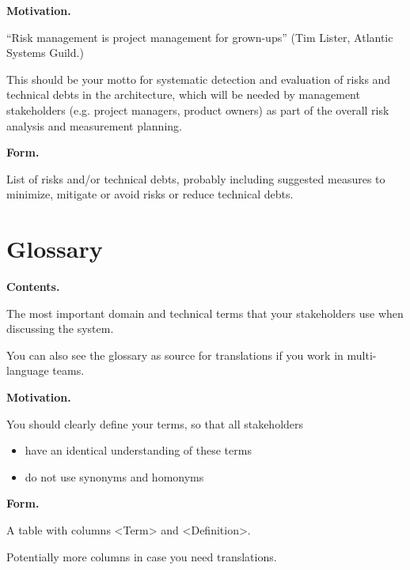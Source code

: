\documentclass[]{article}
\begin{document}
\textbf{Motivation.}

``Risk management is project management for grown-ups'' (Tim Lister,
Atlantic Systems Guild.)

This should be your motto for systematic detection and evaluation of
risks and technical debts in the architecture, which will be needed by
management stakeholders (e.g. project managers, product owners) as part
of the overall risk analysis and measurement planning.

\textbf{Form.}

List of risks and/or technical debts, probably including suggested
measures to minimize, mitigate or avoid risks or reduce technical debts.

\hypertarget{section-glossary}{%
\section{Glossary}\label{section-glossary}}

\textbf{Contents.}

The most important domain and technical terms that your stakeholders use
when discussing the system.

You can also see the glossary as source for translations if you work in
multi-language teams.

\textbf{Motivation.}

You should clearly define your terms, so that all stakeholders

\begin{itemize}
\item
  have an identical understanding of these terms
\item
  do not use synonyms and homonyms
\end{itemize}

\textbf{Form.}

A table with columns \textless{}Term\textgreater{} and
\textless{}Definition\textgreater{}.

Potentially more columns in case you need translations.
\end{document}
